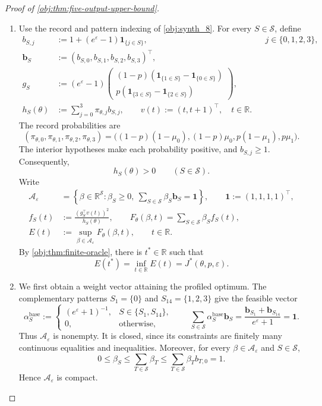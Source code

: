 \documentclass[11pt]{article}
\begin{document}
\begin{proof}[Proof of \cref{obj:thm:five-output-upper-bound}]
\begin{enumerate}
\item
Use the record and pattern indexing of \cref{obj:synth_8}. For every \(S\in\mathcal S\), define
\[
\begin{aligned}
b_{S,j}
&:=1+(e^\varepsilon-1)\mathbf 1_{\{j\in S\}},
&&j\in\{0,1,2,3\},\\
\mathbf b_S&:=(b_{S,0},b_{S,1},b_{S,2},b_{S,3})^\top,\\
g_S
&:=(e^\varepsilon-1)
\begin{pmatrix}
(1-p)(\mathbf 1_{\{1\in S\}}-\mathbf 1_{\{0\in S\}})\\
p(\mathbf 1_{\{3\in S\}}-\mathbf 1_{\{2\in S\}})
\end{pmatrix},\\
h_S(\theta)&:=\sum_{j=0}^{3}\pi_{\theta,j}b_{S,j},
\qquad
v(t):=(t,t+1)^\top,\quad t\in\mathbb R.
\end{aligned}
\]
The record probabilities are
\[
(\pi_{\theta,0},\pi_{\theta,1},\pi_{\theta,2},\pi_{\theta,3})
=
\bigl((1-p)(1-\mu_0),(1-p)\mu_0,
p(1-\mu_1),p\mu_1\bigr).
\]
The interior hypotheses make each probability positive, and
\(b_{S,j}\ge1\). Consequently,
\[
h_S(\theta)>0\qquad(S\in\mathcal S).
\]
Write
\[
\begin{aligned}
\mathcal A_\varepsilon
&=\left\{\beta\in\mathbb R^{\mathcal S}:
\beta_S\ge0,\ 
\sum_{S\in\mathcal S}\beta_S\mathbf b_S=\mathbf1
\right\},
\qquad \mathbf1:=(1,1,1,1)^\top,\\
f_S(t)&:=\frac{(g_S^\top v(t))^2}{h_S(\theta)},
\qquad
F_\theta(\beta,t)=\sum_{S\in\mathcal S}\beta_Sf_S(t),\\
E(t)&:=\sup_{\beta\in\mathcal A_\varepsilon}F_\theta(\beta,t),
\qquad t\in\mathbb R.
\end{aligned}
\]
By \cref{obj:thm:finite-oracle}, there is \(t^*\in\mathbb R\) such that
\[
E(t^*)=\inf_{t\in\mathbb R}E(t)
=J^*(\theta,p,\varepsilon).
\]

\item
We first obtain a weight vector attaining the profiled optimum.
The complementary patterns \(S_1=\{0\}\) and \(S_{14}=\{1,2,3\}\)
give the feasible vector
\[
\alpha^{\mathrm{base}}_S:=
\begin{cases}
(e^\varepsilon+1)^{-1},&S\in\{S_1,S_{14}\},\\
0,&\text{otherwise},
\end{cases}
\qquad
\sum_{S\in\mathcal S}\alpha^{\mathrm{base}}_S\mathbf b_S
=
\frac{\mathbf b_{S_1}+\mathbf b_{S_{14}}}{e^\varepsilon+1}
=\mathbf1.
\]
Thus \(\mathcal A_\varepsilon\) is nonempty. It is closed, since its
constraints are finitely many continuous equalities and inequalities.
Moreover, for every \(\beta\in\mathcal A_\varepsilon\) and \(S\in\mathcal S\),
\[
0\le\beta_S
\le\sum_{T\in\mathcal S}\beta_T
\le\sum_{T\in\mathcal S}\beta_Tb_{T,0}
=1.
\]
Hence \(\mathcal A_\varepsilon\) is compact.


\end{enumerate}
\end{proof}
\end{document}
